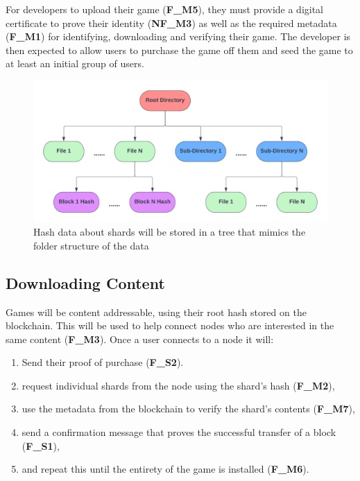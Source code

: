 For developers to upload their game (\textbf{F\_M5}), they must provide a digital certificate to prove their identity (\textbf{NF\_M3}) as well as the required metadata (\textbf{F\_M1}) for identifying, downloading and verifying their game.
The developer is then expected to allow users to purchase the game off them and seed the game to at least an initial group of users.

\begin{figure}[ht]
  \centering
  \includegraphics[width=.85\textwidth]{assets/images/diagrams/block-body.png}
  \caption{Hash data about shards will be stored in a tree that mimics the folder structure of the data}
  \label{fig:hash-storage}
\end{figure}

\subsection*{Downloading Content}

Games will be content addressable, using their root hash stored on the blockchain. This will be used to help connect nodes who are interested in the same content (\textbf{F\_M3}). Once a user connects to a node it will:
\vspace{2mm}
\begin{enumerate}
  \item Send their proof of purchase (\textbf{F\_S2}).
  \item request individual shards from the node using the shard's hash (\textbf{F\_M2}),
  \item use the metadata from the blockchain to verify the shard's contents (\textbf{F\_M7}),
  \item send a confirmation message that proves the successful transfer of a block (\textbf{F\_S1}),
  \item and repeat this until the entirety of the game is installed (\textbf{F\_M6}).
\end{enumerate}

